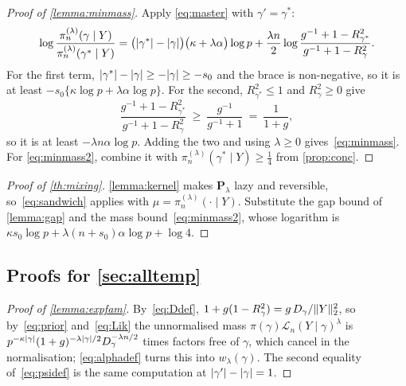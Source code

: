 \begin{proof}[Proof of \cref{lemma:minmass}]
    Apply \eqref{eq:master} with $\gamma'=\gamma^{\ast}$:
    \begin{equation*}
        \log\frac{\pi_n^{(\lambda)}(\gamma\mid Y)}
        {\pi_n^{(\lambda)}(\gamma^{\ast}\mid Y)}
        =\bigl(\lvert\gamma^{\ast}\rvert-\lvert\gamma\rvert\bigr)
        \bigl(\kappa+\lambda\alpha\bigr)\log p
        +\frac{\lambda n}{2}
        \log\frac{g^{-1}+1-R^{2}_{\gamma^{\ast}}}
        {g^{-1}+1-R^{2}_{\gamma}} .
    \end{equation*}
    For the first term, $\lvert\gamma^{\ast}\rvert-\lvert\gamma\rvert\geq-\lvert\gamma\rvert
    \geq-s_0$ and the brace is non-negative, so it is at least
    $-s_0\{\kappa\log p+\lambda\alpha\log p\}$. For the second,
    $R^{2}_{\gamma^{\ast}}\leq1$ and $R^{2}_{\gamma}\geq0$ give
    \begin{equation*}
        \frac{g^{-1}+1-R^{2}_{\gamma^{\ast}}}
        {g^{-1}+1-R^{2}_{\gamma}}
        \ \geq\ \frac{g^{-1}}{g^{-1}+1}\ =\ \frac{1}{1+g},
    \end{equation*}
    so it is at least $-\lambda n\alpha\log p$. Adding the two
    and using $\lambda\geq0$ gives~\eqref{eq:minmass}. For
    \eqref{eq:minmass2}, combine it with $\pi_n^{(\lambda)}
    (\gamma^{\ast}\mid Y)\geq\tfrac14$ from \cref{prop:conc}.
\end{proof}

\begin{proof}[Proof of \cref{th:mixing}]
    \cref{lemma:kernel} makes $\mathbf{P}_\lambda$ lazy and reversible,
    so~\eqref{eq:sandwich} applies with
    $\mu=\pi_n^{(\lambda)}(\cdot\mid Y)$. Substitute the gap bound
    of \cref{lemma:gap} and the mass bound~\eqref{eq:minmass2}, whose
    logarithm is $\kappa s_0\log p+\lambda(n+s_0)\alpha\log p
    +\log4$.
\end{proof}

\subsection{Proofs for \cref{sec:alltemp}}
\label{sub:appalltemp}

\begin{proof}[Proof of \cref{lemma:expfam}]
    By~\eqref{eq:Ddef}, $1+g(1-R^{2}_\gamma)=g\,D_\gamma/\lVert Y\rVert_2^{2}$, so
    by~\eqref{eq:prior} and~\eqref{eq:Lik} the unnormalised mass
    $\pi(\gamma)\mathcal{L}_n(Y\mid\gamma)^{\lambda}$ is
    $p^{-\kappa\lvert\gamma\rvert}(1+g)^{-\lambda\lvert\gamma\rvert/2}
    D_\gamma^{-\lambda n/2}$ times factors free of $\gamma$, which cancel in
    the normalisation; \eqref{eq:alphadef} turns this into
    $w_\lambda(\gamma)$. The second equality of~\eqref{eq:psidef} is the same
    computation at $\lvert\gamma'\rvert-\lvert\gamma\rvert=1$.
\end{proof}

